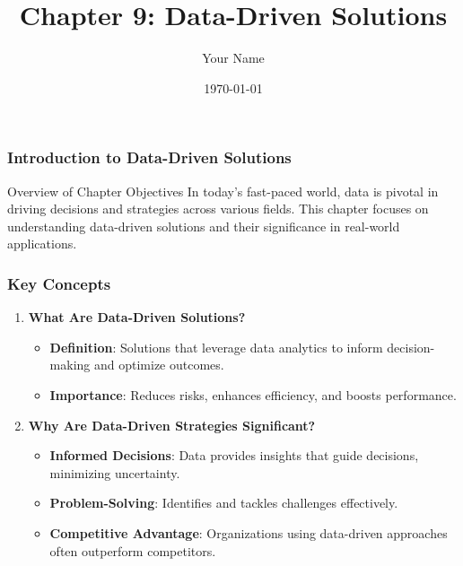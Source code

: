\documentclass[aspectratio=169]{beamer}
\title[Data-Driven Solutions]{Chapter 9: Data-Driven Solutions}
\author[Your Name]{Your Name} %
\institute[Your Institution]{
  Your Institution\\
  \vspace{0.3cm}
  Email: your.email@institution.edu\\
  Website: www.institution.edu
}
\date{\today}
\begin{document}
\frame{\titlepage}

\begin{frame}[fragile]
    \titlepage
\end{frame}

\begin{frame}[fragile]
    \frametitle{Introduction to Data-Driven Solutions}
    \begin{block}{Overview of Chapter Objectives}
        In today's fast-paced world, data is pivotal in driving decisions and strategies across various fields. This chapter focuses on understanding data-driven solutions and their significance in real-world applications.
    \end{block}
\end{frame}

\begin{frame}[fragile]
    \frametitle{Key Concepts}
    \begin{enumerate}
        \item \textbf{What Are Data-Driven Solutions?}
            \begin{itemize}
                \item \textbf{Definition}: Solutions that leverage data analytics to inform decision-making and optimize outcomes.
                \item \textbf{Importance}: Reduces risks, enhances efficiency, and boosts performance.
            \end{itemize}
        
        \item \textbf{Why Are Data-Driven Strategies Significant?}
            \begin{itemize}
                \item \textbf{Informed Decisions}: Data provides insights that guide decisions, minimizing uncertainty.
                \item \textbf{Problem-Solving}: Identifies and tackles challenges effectively.
                \item \textbf{Competitive Advantage}: Organizations using data-driven approaches often outperform competitors.
            \end{itemize}
    \end{enumerate}
\end{frame}
\end{document}
